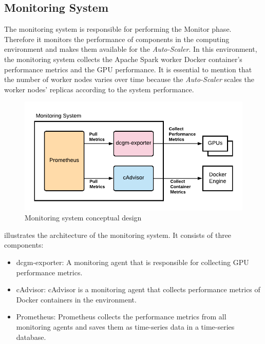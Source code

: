 \subsection{Monitoring System}
The monitoring system is responsible for performing the Monitor phase. Therefore it monitors the performance of components in the computing environment and makes them available for the \textit{Auto-Scaler}.
In this environment, the monitoring system collects the Apache Spark worker Docker container's performance metrics and the GPU performance. It is essential to mention that the number of worker nodes varies over time because the \textit{Auto-Scaler} scales the worker nodes' replicas according to the system performance.
\begin{figure}[h]
\centering
\includegraphics[scale=1]{images/05_conceptual_design/autonomic_manager/monitoring_system_concept}
\caption{Monitoring system conceptual design}
\label{fig:05_am_monitoring_concept}
\end{figure}
 illustrates the architecture of the monitoring system. It consists of three components:
\begin{itemize}
\item dcgm-exporter: A monitoring agent that is responsible for collecting GPU performance metrics.

\item cAdvisor: cAdvisor is a monitoring agent that collects performance metrics of Docker containers in the environment.

\item Prometheus: Prometheus collects the performance metrics from all monitoring agents and saves them as time-series data in a time-series database.
\end{itemize}


